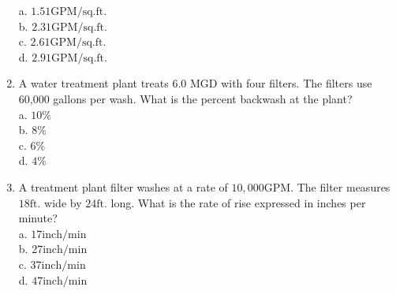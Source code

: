 \begin{enumerate}
a. $1.51 \mathrm{GPM} / \mathrm{sq} . \mathrm{ft}$.\\
b. $2.31 \mathrm{GPM} / \mathrm{sq} . \mathrm{ft}$.\\
c. $2.61 \mathrm{GPM} / \mathrm{sq} . \mathrm{ft}$.\\
d. $2.91 \mathrm{GPM} / \mathrm{sq} . \mathrm{ft}$.\\
\item A water treatment plant treats 6.0 MGD with four filters. The filters use 60,000 gallons per wash. What is the percent backwash at the plant?\\
a. $10 \%$\\
b. $8 \%$\\
c. $6 \%$\\
d. $4 \%$\\
\item A treatment plant filter washes at a rate of $10,000 \mathrm{GPM}$. The filter measures $18 \mathrm{ft}$. wide by $24 \mathrm{ft}$. long. What is the rate of rise expressed in inches per minute?\\
a. $17 \mathrm{inch} / \mathrm{min}$\\
b. $27 \mathrm{inch} / \mathrm{min}$\\
c. $37 \mathrm{inch} / \mathrm{min}$\\
d. $47 \mathrm{inch} / \mathrm{min}$\\



\end{enumerate}

\newpage
